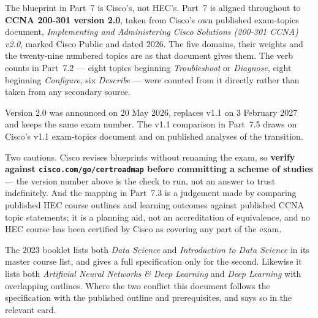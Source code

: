 \documentclass[11pt,a4paper,oneside]{report}
\begin{document}
\vspace{6pt}
\begin{notebox}
The blueprint in Part~7 is Cisco's, not HEC's. Part~7 is aligned throughout to
\textbf{CCNA 200-301 version 2.0}, taken from Cisco's own published exam-topics
document, \emph{Implementing and Administering Cisco Solutions (200-301 CCNA)
v2.0}, marked Cisco Public and dated 2026. The five domains, their weights and
the twenty-nine numbered topics are as that document gives them. The verb counts
in Part~7.2 --- eight topics beginning \emph{Troubleshoot} or \emph{Diagnose},
eight beginning \emph{Configure}, six \emph{Describe} --- were counted from it
directly rather than taken from any secondary source.

Version 2.0 was announced on 20 May 2026, replaces v1.1 on 3 February 2027 and
keeps the same exam number. The v1.1 comparison in Part~7.5 draws on Cisco's
v1.1 exam-topics document and on published analyses of the transition.

Two cautions. Cisco revises blueprints without renaming the exam, so
\textbf{verify against \texttt{cisco.com/go/certroadmap} before committing a
scheme of studies} --- the version number above is the check to run, not an
answer to trust indefinitely. And the mapping in Part~7.3 is a judgement made by
comparing published HEC course outlines and learning outcomes against published
CCNA topic statements; it is a planning aid, not an accreditation of equivalence,
and no HEC course has been certified by Cisco as covering any part of the exam.
\end{notebox}

\vspace{6pt}
\begin{notebox}
The 2023 booklet lists both \emph{Data Science} and \emph{Introduction to Data
Science} in its master course list, and gives a full specification only for the
second. Likewise it lists both \emph{Artificial Neural Networks \& Deep Learning}
and \emph{Deep Learning} with overlapping outlines. Where the two conflict this
document follows the specification with the published outline and prerequisites,
and says so in the relevant card.
\end{notebox}
\end{document}
